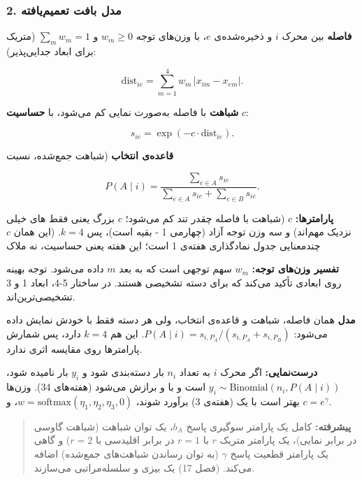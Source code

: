 \subsubsection{\texorpdfstring{2. مدل بافت تعمیم‌یافته
}{2. مدل بافت تعمیم‌یافته (GCM)}}

\textbf{فاصله} بین محرک \(i\) و  ذخیره‌شده‌ی \(e\)، با وزن‌های
توجه \(w_m \ge 0\) و \(\sum_m w_m = 1\) (متریک  برای
ابعاد جدایی‌پذیر):

\[
\mathrm{dist}_{ie} = \sum_{m=1}^{4} w_m\, |x_{im} - x_{em}|.
\]

\textbf{شباهت} با فاصله به‌صورت نمایی کم می‌شود، با \textbf{حساسیت} \(c\):

\[
s_{ie} = \exp(-c \cdot \mathrm{dist}_{ie}).
\]

\textbf{قاعده‌ی انتخاب} (شباهت جمع‌شده، نسبت 

\[
P(A \mid i) = \frac{\sum_{e \in A} s_{ie}}{\sum_{e \in A} s_{ie} + \sum_{e \in B} s_{ie}}.
\]

\textbf{پارامترها:} \(c\) (شباهت با فاصله چقدر تند کم می‌شود؛ \(c\) بزرگ
یعنی فقط های خیلی نزدیک مهم‌اند) و سه وزن توجه آزاد (چهارمی
\lr{\$}1 - \lr{\$} بقیه است)، پس \(k = 4\). (این همان \(c\) چندمعنایی جدول
نمادگذاری هفته‌ی 1 است؛ این هفته یعنی حساسیت، نه ملاک 

\textbf{تفسیر وزن‌های توجه:} \(w_m\) سهم توجهی است که به بعد \(m\) داده
می‌شود. توجه بهینه روی ابعادی تأکید می‌کند که برای دسته تشخیصی
 هستند. در ساختار 5-4، ابعاد 1 و 3 تشخیصی‌ترین‌اند.

\textbf{مدل } همان فاصله، شباهت و قاعده‌ی انتخاب، ولی هر
دسته فقط با  خودش نمایش داده می‌شود:
\(P(A\mid i) = s_{i,P_A}/(s_{i,P_A} + s_{i,P_B})\). این هم \(k = 4\)
دارد، پس شمارش پارامترها روی مقایسه اثری ندارد.

\textbf{درست‌نمایی:} اگر محرک \(i\) به تعداد \(n_i\) بار دسته‌بندی شود و
\(y_i\) بار  نامیده شود،
\(y_i \sim \mathrm{Binomial}(n_i,\allowbreak P(A\mid i))\) است و با  و
 برازش می‌شود (هفته‌های 3\lr{--}4). وزن‌ها بهتر است با یک
\textbf{} (هفته‌ی 3) برآورد شوند،
\(w = \mathrm{softmax}(\eta_1,\allowbreak \eta_2,\allowbreak \eta_3,\allowbreak 0)\)، و
\(c = e^{\gamma}\).

\begin{quote}
\textbf{پیشرفته:}  کامل یک پارامتر سوگیری پاسخ \(b_A\)، یک توان
شباهت (شباهت گاوسی در برابر نمایی)، یک پارامتر متریک \(r\)
 با \(r = 1\) در برابر اقلیدسی با \(r = 2\)) و گاهی یک
پارامتر قطعیت پاسخ  \(\gamma\) (به توان
رساندن شباهت‌های جمع‌شده) اضافه می‌کند.  \lr{\&}  (فصل
17) یک  بیزی و سلسله‌مراتبی می‌سازند.
\end{quote}

